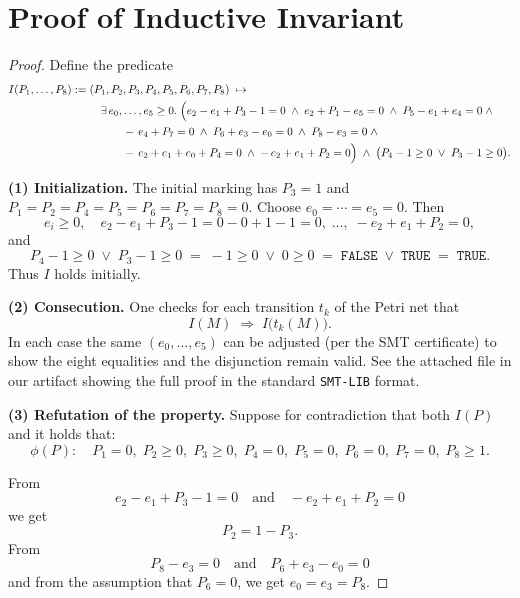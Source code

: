 \appendix

\section{Proof of Inductive Invariant}

\begin{proof}
	
Define the predicate
\[
\begin{aligned}
	I(P_{1},\dots,P_{8})
	:={}&
		(P_{1},\textcolor{black}{P_{2}},\textcolor{black}{P_{3}},P_{4},P_{5},P_{6},\textcolor{black}{P_{7}},\textcolor{black}{P_{8}})
		\;\mapsto\;\\
		&\quad
		\exists\,e_{0},\dots,e_{5}\ge0.\;
		\Bigl(
		e_{2}-e_{1}+\textcolor{black}{P_{3}}-1=0\;\land\;
		e_{2}+P_{1}-e_{5}=0\;\land\;
		P_{5}-e_{1}+e_{4}=0\;\land\\
		&\qquad\quad
		-\,e_{4}+\textcolor{black}{P_{7}}=0\;\land\;
		P_{6}+e_{3}-e_{0}=0\;\land\;
		\textcolor{black}{P_{8}}-e_{3}=0\;\land\\
		&\qquad\quad
		-\,e_{2}+e_{1}+e_{0}+P_{4}=0\;\land\;
		-\,e_{2}+e_{1}+\textcolor{black}{P_{2}}=0
		\Bigr)
		\;\land\;
		\bigl(P_{4}-1\ge0\;\lor\;\textcolor{black}{P_{3}}-1\ge0\bigr).
	\end{aligned}
	\]
	
	
	\medskip\noindent
	\textbf{(1) Initialization.}
	The initial marking has $P_{3}=1$ and $P_{1}=P_{2}=P_{4}=P_{5}=P_{6}=P_{7}=P_{8}=0$.
	Choose $e_{0}=\cdots=e_{5}=0$.  Then
	\[
	e_{i}\ge0,\quad
	e_{2}-e_{1}+P_{3}-1=0-0+1-1=0,\;\dots,\;-e_{2}+e_{1}+P_{2}=0,
	\]
	and 
	\[
	P_{4}-1\ge0\;\lor\;P_{3}-1\ge0
	\;=\;-1\ge0\;\lor\;0\ge0
	\;=\;\texttt{FALSE}\;\lor\;\texttt{TRUE}
	\;=\;\texttt{TRUE}.
	\]
	Thus $I$ holds initially.
	
	\medskip\noindent
	\textbf{(2) Consecution.}
	One checks for each transition $t_{k}$ of the Petri net that
	\[
	I(M)\;\Longrightarrow\;I\bigl(t_{k}(M)\bigr).
	\]
	In each case the same $(e_{0},\dots,e_{5})$ can be adjusted (per the SMT certificate) to show the eight equalities and the disjunction remain valid. See the attached file in our artifact showing the full proof in the standard \texttt{SMT-LIB} format.
	
	\medskip\noindent
	\textbf{(3) Refutation of the property.}
	Suppose for contradiction that both $I(P)$ and it holds that:
	\[
	\phi(P):\quad
	P_{1}=0,\;
	P_{2}\ge0,\;
	P_{3}\ge0,\;
	P_{4}=0,\;
	P_{5}=0,\;
	P_{6}=0,\;
	P_{7}=0,\;
	P_{8}\ge1.
	\] 
	
	\noindent
	From
	\[
	e_{2}-e_{1}+P_{3}-1=0
	\quad\text{and}\quad
	-e_{2}+e_{1}+P_{2}=0
	\]
	we get
	\[
	P_{2}=1-P_{3}.
	\]
	From
	\[
	P_{8}-e_{3}=0
	\quad\text{and}\quad
	P_{6}+e_{3}-e_{0}=0
	\]
	and from the assumption that $P_6=0$, we get $e_{0}=e_{3}=P_{8}$.
	

\end{proof}
